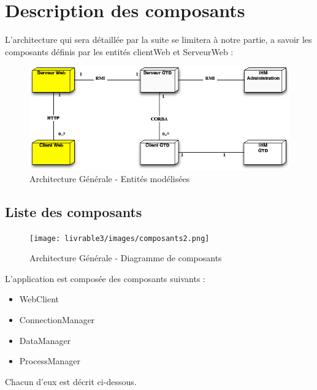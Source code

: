 \chapter{Description des composants}

L'architecture qui sera détaillée par la suite se limitera à notre partie, a
savoir les composants définis par les entités clientWeb et ServeurWeb : \\

\begin{figure}[H]
\begin{center}
\includegraphics[scale=0.9]{livrable3/images/archi.png}
\caption{Architecture Générale - Entités modélisées}
\end{center}
\end{figure}


\section{Liste des composants}

\begin{figure}[H]
\begin{center}
\texttt{[image: livrable3/images/composants2.png]}
\caption{Architecture Générale - Diagramme de composants}
\end{center}
\end{figure}

L'application est composée des composants suivants :
\begin{itemize}
  \item WebClient
  \item ConnectionManager
  \item DataManager
  \item ProcessManager
\end{itemize}

Chacun d'eux est décrit ci-dessous.





